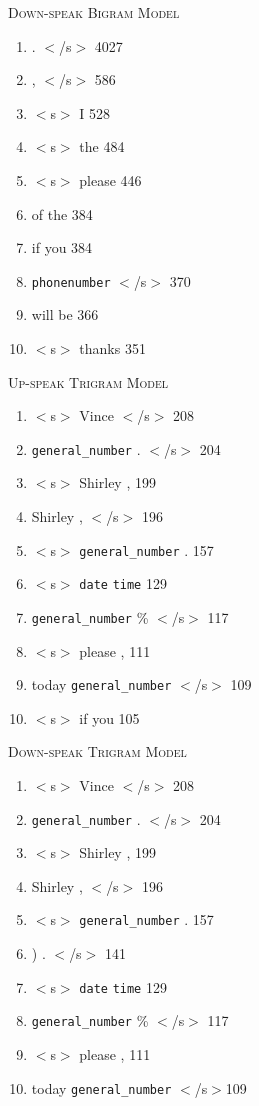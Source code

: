 \documentclass{article} %
\begin{document}
\textsc{Down-speak Bigram Model}\\
\begin{enumerate}
\item . $<$/s$>$ 4027
\item , $<$/s$>$ 586
\item $<$s$>$ I 528
\item $<$s$>$ the 484
\item $<$s$>$ please 446
\item of the 384
\item if you 384
\item \texttt{phonenumber} $<$/s$>$ 370
\item will be 366
\item $<$s$>$  thanks 351
\end{enumerate}

\textsc{Up-speak Trigram Model}\\
\begin{enumerate}
\item $<$s$>$  Vince $<$/s$>$ 208
\item \texttt{general\_number} . $<$/s$>$ 204
\item $<$s$>$  Shirley , 199
\item Shirley , $<$/s$>$ 196
\item $<$s$>$  \texttt{general\_number} . 157
\item $<$s$>$  \texttt{date} \texttt{time} 129
\item \texttt{general\_number} \% $<$/s$>$ 117
\item $<$s$>$  please , 111
\item today \texttt{general\_number} $<$/s$>$ 109
\item $<$s$>$  if you 105
\end{enumerate}

\textsc{Down-speak Trigram Model}\\
\begin{enumerate}
\item $<$s$>$  Vince $<$/s$>$ 208
\item \texttt{general\_number} . $<$/s$>$ 204
\item $<$s$>$  Shirley , 199
\item Shirley , $<$/s$>$ 196
\item $<$s$>$  \texttt{general\_number} . 157
\item ) . $<$/s$>$ 141
\item $<$s$>$  \texttt{date} \texttt{time} 129
\item \texttt{general\_number} \% $<$/s$>$ 117
\item $<$s$>$  please , 111
\item today \texttt{general\_number} $<$/s$>$109
\end{enumerate}
\end{document}
